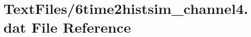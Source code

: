 \hypertarget{6time2histsim__channel4_8dat}{}\section{Text\+Files/6time2histsim\+\_\+channel4.dat File Reference}
\label{6time2histsim__channel4_8dat}
